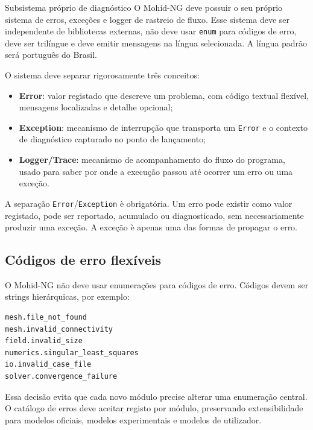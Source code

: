 \documentclass[11pt,a4paper]{article}
\begin{document}
\begin{decisionbox}{Subsistema pr\'oprio de diagn\'ostico}
O Mohid-NG deve possuir o seu pr\'oprio sistema de erros, exce\c{c}\~oes e logger de rastreio de fluxo. Esse sistema deve ser independente de bibliotecas externas, n\~ao deve usar \texttt{enum} para c\'odigos de erro, deve ser tril\'ingue e deve emitir mensagens na l\'ingua selecionada. A l\'ingua padr\~ao ser\'a portugu\^es do Brasil.
\end{decisionbox}

O sistema deve separar rigorosamente tr\^es conceitos:
\begin{itemize}
  \item \textbf{Error}: valor registado que descreve um problema, com c\'odigo textual flex\'ivel, mensagens localizadas e detalhe opcional;
  \item \textbf{Exception}: mecanismo de interrup\c{c}\~ao que transporta um \texttt{Error} e o contexto de diagn\'ostico capturado no ponto de lan\c{c}amento;
  \item \textbf{Logger/Trace}: mecanismo de acompanhamento do fluxo do programa, usado para saber por onde a execu\c{c}\~ao passou at\'e ocorrer um erro ou uma exce\c{c}\~ao.
\end{itemize}

A separa\c{c}\~ao \texttt{Error}/\texttt{Exception} \`e obrigat\'oria. Um erro pode existir como valor registado, pode ser reportado, acumulado ou diagnosticado, sem necessariamente produzir uma exce\c{c}\~ao. A exce\c{c}\~ao \`e apenas uma das formas de propagar o erro.

\subsection{C\'odigos de erro flex\'iveis}

O Mohid-NG n\~ao deve usar enumera\c{c}\~oes para c\'odigos de erro. C\'odigos devem ser strings hier\'arquicas, por exemplo:
\begin{lstlisting}[style=tree]
mesh.file_not_found
mesh.invalid_connectivity
field.invalid_size
numerics.singular_least_squares
io.invalid_case_file
solver.convergence_failure
\end{lstlisting}

Essa decis\~ao evita que cada novo m\'odulo precise alterar uma enumera\c{c}\~ao central. O cat\'alogo de erros deve aceitar registo por m\'odulo, preservando extensibilidade para modelos oficiais, modelos experimentais e modelos de utilizador.
\end{document}
